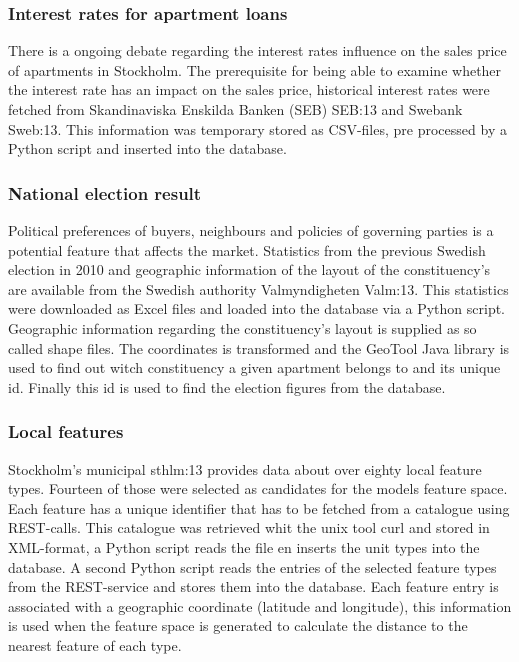 \subsubsection{Interest rates for apartment loans} \label{sss:interest_rates}
There is a ongoing debate regarding the interest rates influence on the sales price of apartments in Stockholm. The prerequisite for being able to examine whether the interest rate has an impact on the sales price, historical interest rates were fetched from Skandinaviska Enskilda Banken (SEB) \cite{dat}{SEB:13} and Swebank \cite{dat}{Sweb:13}. This information was temporary stored as CSV-files, pre processed by a Python script and inserted into the database. 

\subsubsection{National election result} \label{sss:election_stats}
Political preferences of buyers, neighbours and policies of governing parties is a potential feature that affects the market. Statistics from the previous Swedish election in 2010 and geographic information of the layout of the constituency's are available from the Swedish authority Valmyndigheten \cite{dat}{Valm:13}. This statistics were downloaded as Excel files and loaded into the database via a Python script. Geographic information regarding the constituency's layout is supplied as so called shape files. The coordinates is transformed and the GeoTool Java library is used to find out witch constituency a given apartment belongs to and its unique id. Finally this id is used to find the election figures from the database.

\subsubsection{Local features} \label{sss:local_features}
Stockholm's municipal \cite{dat}{sthlm:13} provides data about over eighty local feature types. Fourteen of those were selected as candidates for the models feature space. Each feature has a unique identifier that has to be fetched from a catalogue using REST-calls. This catalogue was retrieved whit the unix tool curl and stored in XML-format, a Python script reads the file en inserts the unit types into the database. A second Python script reads the entries of the selected feature types from the REST-service and stores them into the database. Each feature entry is associated with a geographic coordinate (latitude and longitude), this information is used when the feature space is generated to calculate the distance to the nearest feature of each type.   

